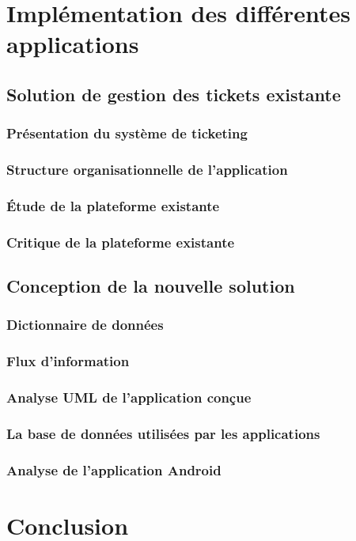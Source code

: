 \documentclass[12pt,table,a4paper]{report}
\begin{document}
\chapter{Implémentation des différentes applications}

\section{Solution de gestion des tickets existante}

\subsection{Présentation du système de ticketing}

\subsection{Structure organisationnelle de l'application}

\subsection{Étude de la plateforme existante}

\subsection{Critique de la plateforme existante}

\section{Conception de la nouvelle solution}

\subsection{Dictionnaire de données}

\subsection{Flux d'information}

\subsection{Analyse UML de l'application conçue}

\subsection{La base de données utilisées par les applications}

\subsection{Analyse de l'application Android}

\chapter{Conclusion}
\end{document}
